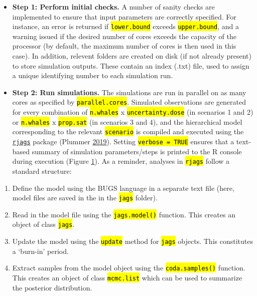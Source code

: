 \documentclass[
]{article}
\providecommand{\tightlist}{%
  \setlength{\itemsep}{0pt}\setlength{\parskip}{0pt}}
\begin{document}
\begin{itemize}
\item
  \textbf{Step 1: Perform initial checks.} A number of sanity checks are implemented to ensure that input parameters are correctly specified. For instance, an error is returned if \textcolor{codecolor}{\texttt{\hl{lower.bound}}} exceeds \textcolor{codecolor}{\texttt{\hl{upper.bound}}}, and a warning issued if the desired number of cores exceeds the capacity of the processor (by default, the maximum number of cores is then used in this case). In addition, relevent folders are created on disk (if not already present) to store simulation outputs. These contain an index (.txt) file, used to assign a unique identifying number to each simulation run.
\item
  \textbf{Step 2: Run simulations.} The simulations are run in parallel on as many cores as specified by \textcolor{codecolor}{\texttt{\hl{parallel.cores}}}. Simulated observations are generated for every combination of \textcolor{codecolor}{\texttt{\hl{n.whales}}} x \textcolor{codecolor}{\texttt{\hl{uncertainty.dose}}} (in scenarios 1 and 2) or \textcolor{codecolor}{\texttt{\hl{n.whales}}} x \textcolor{codecolor}{\texttt{\hl{prop.sat}}} (in scenarios 3 and 4), and the hierarchical model corresponding to the relevant \textcolor{codecolor}{\texttt{\hl{scenario}}} is compiled and executed using the \href{https://CRAN.R-project.org/package=rjags}{\texttt{rjags}} package (Plummer \protect\hyperlink{ref-Plummer2019}{2019}). Setting \textcolor{codecolor}{\texttt{\hl{verbose = TRUE}}} ensures that a text-based summary of simulation parameters/steps is printed to the R console during execution (Figure \hyperlink{fig1}{1}). As a reminder, analyses in \textcolor{codecolor}{\texttt{\hl{rjags}}} follow a standard structure:
\end{itemize}

\begin{enumerate}
\def\labelenumi{\arabic{enumi}.}
\tightlist
\item
  Define the model using the BUGS language in a separate text file (here, model files are saved in the in the \textcolor{codecolor}{\texttt{\hl{jags}}} folder).
\item
  Read in the model file using the \textcolor{codecolor}{\texttt{\hl{jags.model()}}} function. This creates an object of class \textcolor{codecolor}{\texttt{\hl{jags}}}.
\item
  Update the model using the \textcolor{codecolor}{\texttt{\hl{update}}} method for \textcolor{codecolor}{\texttt{\hl{jags}}} objects. This constitutes a `burn-in' period.
\item
  Extract samples from the model object using the \textcolor{codecolor}{\texttt{\hl{coda.samples()}}} function. This creates an object of class \textcolor{codecolor}{\texttt{\hl{mcmc.list}}} which can be used to summarize the posterior distribution.
\end{enumerate}
\end{document}
